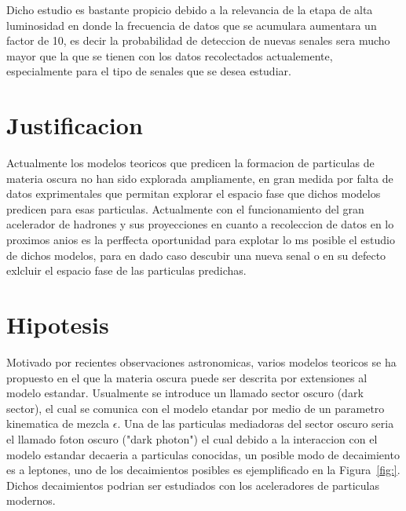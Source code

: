 Dicho estudio es bastante propicio debido a la relevancia de la etapa de alta luminosidad en donde la frecuencia de datos que se acumulara aumentara un factor de 10, es decir la probabilidad de deteccion de nuevas senales sera mucho mayor que la que se tienen con los datos recolectados actualemente, especialmente para el tipo de senales que se desea estudiar. 


\chapter{Justificacion}

Actualmente los modelos teoricos que predicen la formacion de particulas de materia oscura no han sido explorada ampliamente, en gran medida por falta de datos exprimentales que permitan explorar el espacio fase que dichos modelos predicen para esas particulas.  Actualmente con el funcionamiento del gran acelerador de hadrones y sus proyecciones en cuanto a recoleccion de datos en lo proximos anios es la perffecta oportunidad para explotar lo ms posible el estudio de dichos modelos, para en dado caso descubir una nueva senal o en su defecto exlcluir el espacio fase de las particulas predichas. 

\chapter{Hipotesis}
Motivado por recientes observaciones astronomicas, varios modelos teoricos se ha propuesto en el que la materia oscura puede ser descrita por extensiones al modelo estandar. Usualmente se introduce un llamado sector oscuro (dark sector), el cual se comunica con el modelo etandar por medio de un parametro kinematica de mezcla $\epsilon$. Una de las particulas mediadoras del sector oscuro seria el llamado foton oscuro ("dark photon") el cual debido a la interaccion con el modelo estandar decaeria a particulas conocidas, un posible modo de decaimiento es a leptones, uno de los decaimientos posibles es ejemplificado en la Figura~\ref{fig:}.  Dichos decaimientos podrian ser estudiados con los aceleradores de particulas modernos. 


